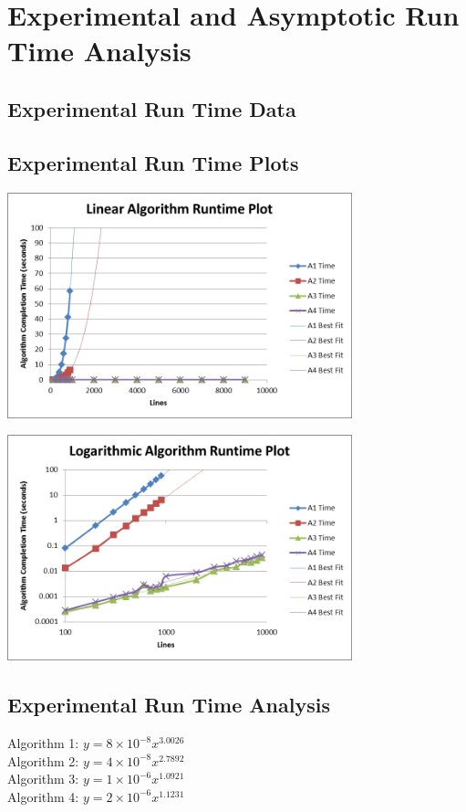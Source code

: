 \documentclass{article}
\begin{document}
\section*{Experimental and Asymptotic Run Time Analysis}
\subsection*{Experimental Run Time Data}


\pagebreak

\subsection*{Experimental Run Time Plots}
\centerline{\includegraphics[width=0.75\textwidth]{plot1.png}}
\centerline{\includegraphics[width=0.75\textwidth]{plot2.png}}

\pagebreak

\subsection*{Experimental Run Time Analysis}
Algorithm 1: $y=8 \times 10^{-8}x^{3.0026}$\\
Algorithm 2: $y=4 \times 10^{-8}x^{2.7892}$\\
Algorithm 3: $y=1 \times 10^{-6}x^{1.0921}$\\
Algorithm 4: $y=2 \times 10^{-6}x^{1.1231}$\\
\end{document}
